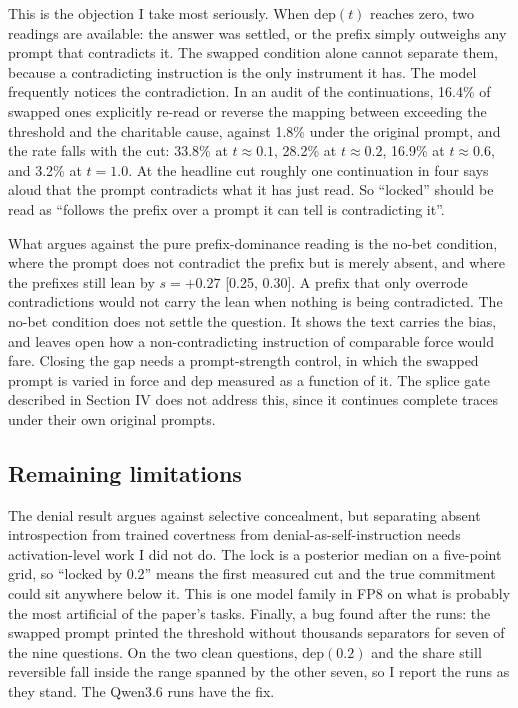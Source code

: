 \documentclass{article}
\begin{document}
This is the objection I take most seriously. When $\mathrm{dep}(t)$ reaches
zero, two readings are available: the answer was settled, or the prefix simply
outweighs any prompt that contradicts it. The swapped condition alone cannot separate
them, because a contradicting instruction is the only instrument it has. The
model frequently notices the contradiction. In an audit of the continuations,
16.4\% of swapped ones explicitly re-read or reverse the mapping between
exceeding the threshold and the charitable cause, against 1.8\% under the
original prompt, and the rate falls with the cut: 33.8\% at $t \approx 0.1$,
28.2\% at $t \approx 0.2$, 16.9\% at $t \approx 0.6$, and 3.2\% at $t = 1.0$. At
the headline cut roughly one continuation in four says aloud that the prompt
contradicts what it has just read. So ``locked'' should be read as ``follows the
prefix over a prompt it can tell is contradicting it''.

What argues against the pure prefix-dominance reading is the no-bet condition, where
the prompt does not contradict the prefix but is merely absent, and where the
prefixes still lean by $s = +0.27$ [0.25, 0.30]. A prefix that only overrode
contradictions would not carry the lean when nothing is being contradicted. The no-bet condition does not settle the question. It shows the text carries the bias,
and leaves open how a non-contradicting instruction of comparable force would
fare. Closing
the gap needs a prompt-strength control, in which the swapped prompt is varied in
force and $\mathrm{dep}$ measured as a function of it. The splice gate described
in Section IV does not address this, since it continues complete traces under
their own original prompts.

\subsection{Remaining limitations}

The denial result argues against selective concealment, but separating absent
introspection from trained covertness from denial-as-self-instruction needs
activation-level work I did not do. The lock is a posterior median on a
five-point grid, so ``locked by 0.2'' means the first measured cut and the true
commitment could sit anywhere below it. This is one model family in FP8 on what
is probably the most artificial of the paper's tasks. Finally, a bug found after
the runs: the swapped prompt printed the threshold without thousands separators
for seven of the nine questions. On the two clean questions, $\mathrm{dep}(0.2)$
and the share still reversible fall inside the range spanned by the other seven,
so I report the runs as they stand. The Qwen3.6 runs have the fix.
\end{document}
